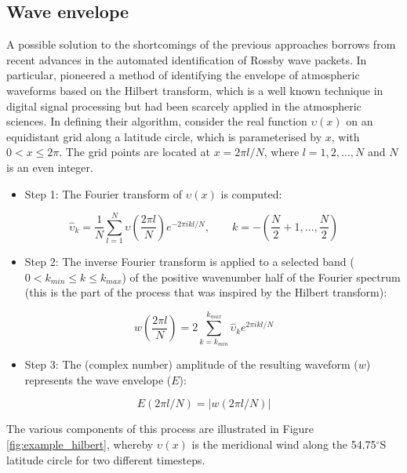 \subsection{Wave envelope}

A possible solution to the shortcomings of the previous approaches borrows from recent advances in the automated identification of Rossby wave packets. In particular, \citet{Zimin2003} pioneered a method of identifying the envelope of atmospheric waveforms based on the Hilbert transform, which is a well known technique in digital signal processing but had been scarcely applied in the atmospheric sciences. In defining their algorithm, \citet{Zimin2003} consider the real function $\upsilon(x)$ on an equidistant grid along a latitude circle, which is parameterised by $x$, with $0 < x \leq 2\pi$. The grid points are located at $x = 2 \pi l / N$, where $l = 1, 2, \dotsc, N$ and $N$ is an even integer.
\begin{itemize}
\item Step 1: The Fourier transform of $\upsilon(x)$ is computed:
\end{itemize}

\begin{equation}\label{eq:fourier_transform}
\hat{\upsilon}_k = \frac{1}{N}\sum_{l=1}^N \upsilon \left( \frac{2 \pi l}{N} \right) e^{-2 \pi ikl/N},\qquad k = -\left( \frac{N}{2} + 1, \dotsc, \frac{N}{2} \right)
\end{equation}

\begin{itemize}
\item Step 2: The inverse Fourier transform is applied to a selected band ($0 < k_{min} \leq k \leq k_{max}$) of the positive wavenumber half of the Fourier spectrum (this is the part of the process that was inspired by the Hilbert transform):
\end{itemize}

\begin{equation}\label{eq:inverse_transform}
w \left( \frac{2 \pi l}{N} \right) = 2 \sum_{k=k_{min}}^{k_{max}} \hat{\upsilon}_k e^{2\pi ikl/N}
\end{equation}

\begin{itemize}
\item Step 3: The (complex number) amplitude of the resulting waveform ($w$) represents the wave envelope ($E$):
\end{itemize}

\begin{equation}\label{eq:wave_envelope}
E(2 \pi l / N) = | w(2 \pi l / N) |
\end{equation}

The various components of this process are illustrated in Figure \ref{fig:example_hilbert}, whereby $\upsilon(x)$ is the meridional wind along the 54.75$^{\circ}$S latitude circle for two different timesteps. 
